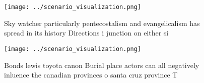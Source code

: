 \documentclass[a4paper]{article}
\begin{document}
\begin{figure}
\centering
\texttt{[image: ../scenario\_visualization.png]}
\caption{Sky watcher particularly pentecostalism and evangelicalism has spread in its history Directions i junction on either si
}
\end{figure}
 
\begin{figure}
\centering
\texttt{[image: ../scenario\_visualization.png]}
\caption{Bonds lewis toyota canon Burial place actors can all negatively inluence the canadian provinces o santa cruz province T
}
\end{figure}
 
\end{document}
